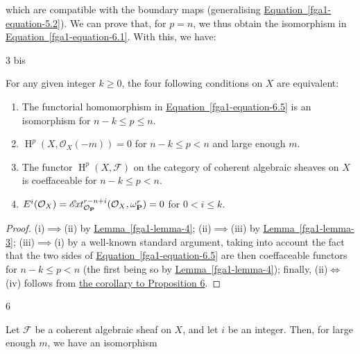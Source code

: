   which are compatible with the boundary maps (generalising \hyperref[fga1-equation-5.2]{Equation~\ref*{fga1-equation-5.2}}).
  We can prove that, for \(p=n\), we thus obtain the isomorphism in \hyperref[fga1-equation-6.1]{Equation~\ref*{fga1-equation-6.1}}.
  With this, we have:\begin{theorem}{3 bis}\label{fga1-theorem-3bis}\skipsinglepar\par{}For any given integer \(k\geqslant 0\), the four following conditions on \(X\) are equivalent:

    
 \begin{enumerate}
      
 \item[i.]
        The functorial homomorphism in \hyperref[fga1-equation-6.5]{Equation~\ref*{fga1-equation-6.5}} is an isomorphism for \(n-k\leqslant  p\leqslant  n\).
      


      
 \item[ii.]
        \(\operatorname {H}^p(X,\mathcal {O}_X(-m)) = 0\) for \(n-k\leqslant  p<n\) and large enough \(m\).
      


      
 \item[iii.]
        The functor \(\operatorname {H}^p(X,\mathscr {F})\) on the category of coherent algebraic sheaves on \(X\) is coeffaceable for \(n-k\leqslant  p<n\).
      


      
 \item[iv.]
        \(E^i(\mathcal {O}_X) = \mathscr {E}\kern  -1.5pt\mathit {xt}_{\mathcal {O}_\mathbf {P}}^{r-n+i}(\mathcal {O}_X,\omega _\mathbf {P}^r) = 0\) for \(0<i\leqslant  k\).
      

    \end{enumerate}\begin{proof}\par{}(i)\(\implies \)(ii) by \hyperref[fga1-lemma-4]{Lemma~\ref*{fga1-lemma-4}};
      (ii)\(\implies \)(iii) by \hyperref[fga1-lemma-3]{Lemma~\ref*{fga1-lemma-3}};
      (iii)\(\implies \)(i) by a well-known standard argument, taking into account the fact that the two sides of \hyperref[fga1-equation-6.5]{Equation~\ref*{fga1-equation-6.5}} are then coeffaceable functors for \(n-k\leqslant  p<n\) (the first being so by \hyperref[fga1-lemma-4]{Lemma~\ref*{fga1-lemma-4}});
      finally, (ii)\(\iff \)(iv) follows from \hyperref[fga1-proposition-6-corollary]{the corollary to Proposition 6}.\end{proof}\end{theorem}\begin{proposition}{6}\label{fga1-proposition-6}\skipsinglepar\par{}Let \(\mathscr {F}\) be a coherent algebraic sheaf on \(X\), and let \(i\) be an integer.
    Then, for large enough \(m\), we have an isomorphism


\end{proposition}

